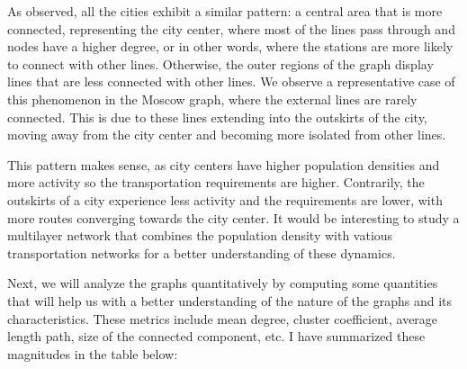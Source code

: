 \begin{figure}[!htb]
\begin{minipage}[b]{0.24\textwidth}
    \end{minipage}

\end{figure}


As observed, all the cities exhibit a similar pattern: a central area that is more connected, representing the city center, where most of the lines pass through and nodes have a higher degree, or in other words, where the stations are more likely to connect with other lines. Otherwise, the outer regions of the graph display lines that are less connected with other lines. We observe a representative case of this phenomenon in the Moscow graph, where the external lines are rarely connected. This is due to these lines extending into the outskirts of the city, moving away from the city center and becoming more isolated from other lines. 

This pattern makes sense, as city centers have higher population densities and more activity so the transportation requirements are higher.  Contrarily, the outskirts of a city experience less activity and the requirements are lower, with more routes converging towards the city center. It would be interesting to study a multilayer network that combines the population density with vatious transportation networks for a better understanding of these dynamics.


Next, we will analyze the graphs quantitatively by computing some quantities that will help us with a better understanding of the nature of the graphs and its characteristics. These metrics include mean degree, cluster coefficient,  average length path, size of the connected component, etc. I have summarized these magnitudes in the table below:

